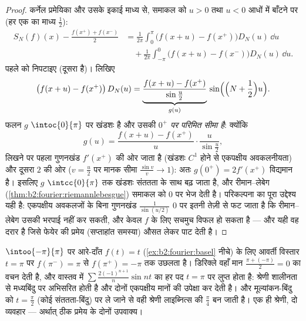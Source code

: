 \begin{proof}
कर्नेल प्रमेयिका और उसके इकाई माध्य से, समाकल को $u > 0$ तथा $u < 0$ आधों में
बाँटने पर (हर एक का माध्य $\frac12$):
\begin{align*}
S_N(f)(x) - \frac{f(x^+) + f(x^-)}{2}
&= \frac{1}{2\pi}\int_{0}^{\pi} \bigl(f(x+u) -
f(x^+)\bigr)D_N(u)\,\dd u\\
&\quad+ \frac{1}{2\pi}\int_{-\pi}^{0}\bigl(f(x+u) -
f(x^-)\bigr)D_N(u)\,\dd u .
\end{align*}
पहले को निपटाइए (दूसरा  है)। लिखिए
\[
\bigl(f(x + u) - f(x^+)\bigr)\,D_N(u)
= \underbrace{\frac{f(x+u) - f(x^+)}{\sin\frac u2}}_{g(u)}\,
\sin\Bigl(\Bigl(N + \frac12\Bigr)u\Bigr) .
\]
फलन $g$ $\intoc{0}{\pi}$ पर खंडशः  है और उसकी \emph{$0^+$ पर परिमित सीमा है}:
क्योंकि
\[
g(u) = \frac{f(x+u) - f(x^+)}{u}\cdot\frac{u}{\sin\frac u2} ,
\]
लिखने पर पहला गुणनखंड $f'(x^+)$ की ओर जाता है (खंडशः $C^1$ होने से एकपक्षीय
अवकलनीयता) और दूसरा $2$ की ओर ($v = \frac
u2$ पर मानक सीमा $\frac{\sin v}{v} \to 1$): अतः $g(0^+) = 2f'(x^+)$
विद्यमान है। इसलिए $g$ $\intcc{0}{\pi}$ तक खंडशः संततता के साथ बढ़ जाता है, और
रीमान--लेबेग (\cref{thm:b2:fourier:riemannlebesgue}) समाकल को $0$ पर भेज देती है। परिकल्पना का पूरा
उद्देश्य यही है: एकपक्षीय अवकलजों के बिना गुणनखंड $\frac{1}{\sin(u/2)}$ $0$ पर इतनी तेज़ी
से फट जाता है कि रीमान--लेबेग उसकी भरपाई नहीं कर सकती, और केवल  $f$
के लिए  सचमुच विफल हो सकता है --- और यही वह दरार है जिसे
फेयेर की प्रमेय (सप्ताहांत समस्या) औसत लेकर पाट देती है।
\end{proof}

\begin{example}[किसी उछाल पर डिरिक्ले]\label{ex:b2:fourier:jumpvalue}
$\intoo{-\pi}{\pi}$ पर आरे-दाँत $f(t) = t$ (\cref{ex:b2:fourier:basel} नीचे) के लिए आवर्ती विस्तार $t = \pi$ पर $f(\pi^-) = \pi$ से $f(\pi^+) = -\pi$
तक उछलता है। डिरिक्ले वहाँ मान $\frac{\pi + (-\pi)}{2} = 0$ का वचन देती है, और वास्तव में $\sum
\frac{2(-1)^{n+1}}{n}\sin nt$ का
हर पद $t = \pi$ पर लुप्त होता है: श्रेणी शालीनता से मध्यबिंदु पर अभिसरित होती
है और दोनों एकपक्षीय मानों की उपेक्षा कर देती है। और मूल्यांकन-बिंदु को
$t =
\frac\pi2$ (कोई संततता-बिंदु) पर ले जाने से वही श्रेणी लाइब्नित्स की $\frac\pi4$ बन
जाती है। एक ही श्रेणी, दो व्यवहार --- अर्थात् ठीक प्रमेय के दोनों उपवाक्य।
\end{example}


